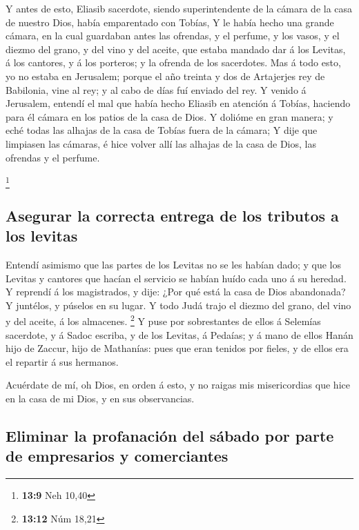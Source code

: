  Y antes de esto, Eliasib sacerdote, siendo
superintendente de la cámara de la casa de nuestro Dios, había
emparentado con Tobías,  Y le había hecho una grande
cámara, en la cual guardaban antes las ofrendas, y el perfume, y los
vasos, y el diezmo del grano, y del vino y del aceite, que estaba
mandado dar á los Levitas, á los cantores, y á los porteros; y la
ofrenda de los sacerdotes.  Mas á todo esto, yo no estaba
en Jerusalem; porque el año treinta y dos de Artajerjes rey de
Babilonia, vine al rey; y al cabo de días fuí enviado del rey.
 Y venido á Jerusalem, entendí el mal que había hecho
Eliasib en atención á Tobías, haciendo para él cámara en los patios de
la casa de Dios.  Y dolióme en gran manera; y eché todas
las alhajas de la casa de Tobías fuera de la cámara;  Y
dije que limpiasen las cámaras, é hice volver allí las alhajas de la
casa de Dios, las ofrendas y el perfume.

\footnote{\textbf{13:9} Neh 10,40}

\hypertarget{asegurar-la-correcta-entrega-de-los-tributos-a-los-levitas}{%
\subsection{Asegurar la correcta entrega de los tributos a los
levitas}\label{asegurar-la-correcta-entrega-de-los-tributos-a-los-levitas}}

 Entendí asimismo que las partes de los Levitas no se les
habían dado; y que los Levitas y cantores que hacían el servicio se
habían huído cada uno á su heredad.  Y reprendí á los
magistrados, y dije: ¿Por qué está la casa de Dios abandonada? Y
juntélos, y púselos en su lugar.  Y todo Judá trajo el
diezmo del grano, del vino y del aceite, á los almacenes. \footnote{\textbf{13:12}
  Núm 18,21}  Y puse por sobrestantes de ellos á Selemías
sacerdote, y á Sadoc escriba, y de los Levitas, á Pedaías; y á mano de
ellos Hanán hijo de Zaccur, hijo de Mathanías: pues que eran tenidos por
fieles, y de ellos era el repartir á sus hermanos.

 Acuérdate de mí, oh Dios, en orden á esto, y no raigas
mis misericordias que hice en la casa de mi Dios, y en sus observancias.

\hypertarget{eliminar-la-profanaciuxf3n-del-suxe1bado-por-parte-de-empresarios-y-comerciantes}{%
\subsection{Eliminar la profanación del sábado por parte de empresarios
y
comerciantes}\label{eliminar-la-profanaciuxf3n-del-suxe1bado-por-parte-de-empresarios-y-comerciantes}}

